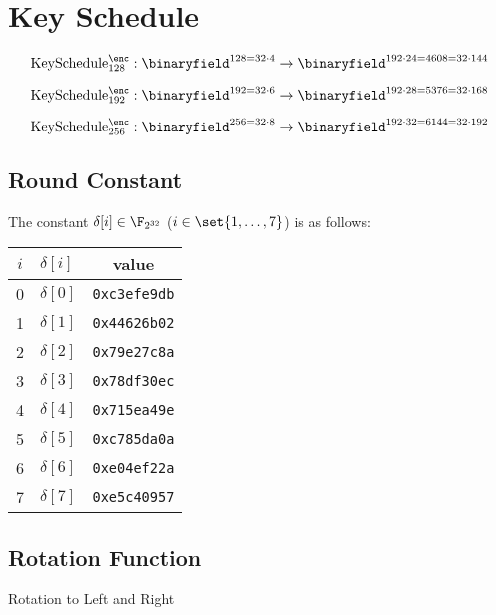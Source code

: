 \section{Key Schedule}

$$
\text{KeySchedule}^{\enc}_{128}:\binaryfield^{128=32\cdot 4}\to\binaryfield^{192\cdot 24=4608=32\cdot 144}
$$

$$
\text{KeySchedule}^{\enc}_{192}:\binaryfield^{192=32\cdot 6}\to\binaryfield^{192\cdot 28=5376=32\cdot 168}
$$

$$
\text{KeySchedule}^{\enc}_{256}:\binaryfield^{256=32\cdot 8}\to\binaryfield^{192\cdot 32=6144=32\cdot 192}
$$

\subsection{Round Constant}
The constant $\delta[i]\in\F_{2^{32}}$ ($i\in\set{1,\dots,7}$) is as follows:
\begin{table}[h!]\centering\renewcommand{\arraystretch}{1.25} %
	\begin{tabular}{c|lc}
		$i$ & $\delta[i]$ & value\\
		\midrule
		0 & $\delta[0]$ & \texttt{0xc3efe9db}\\
		1 & $\delta[1]$ & \texttt{0x44626b02}\\
		2 & $\delta[2]$ & \texttt{0x79e27c8a}\\
		3 & $\delta[3]$ & \texttt{0x78df30ec}\\
		4 & $\delta[4]$ & \texttt{0x715ea49e}\\
		5 & $\delta[5]$ & \texttt{0xc785da0a}\\
		6 & $\delta[6]$ & \texttt{0xe04ef22a}\\
		7 & $\delta[7]$ & \texttt{0xe5c40957}
	\end{tabular}
\end{table}

\subsection{Rotation Function}

\begin{algorithm}[H]
	\caption{Rotation to Left and Right}
	\BlankLine
\end{algorithm}

